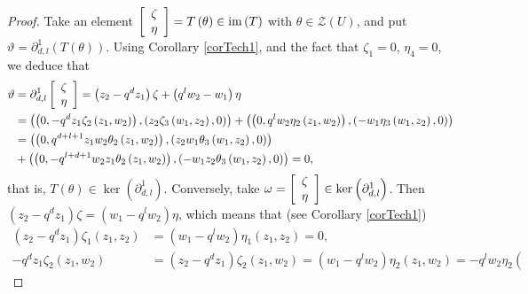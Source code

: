 \documentclass[12pt,reqno]{amsart}%
\theoremstyle{plain}
\numberwithin{theorem}{section} \numberwithin{equation}{section}
\numberwithin{lemma}{section}
\numberwithin{remark}{section}
\numberwithin{example}{section}
\numberwithin{proposition}{section}
\numberwithin{definition}{section}
\numberwithin{corollary}{section}
\begin{document}
\begin{proof}
Take an element $\left[
\begin{array}
[c]{c}%
\zeta\\
\eta
\end{array}
\right]  =T\left(  \theta\right)  \in\operatorname{im}\left(  T\right)  $ with
$\theta\in\mathcal{Z}\left(  U\right)  $, and put $\vartheta=\partial
_{d,l}^{1}\left(  T\left(  \theta\right)  \right)  $. Using Corollary
\ref{corTech1}, and the fact that $\zeta_{1}=0$, $\eta_{4}=0$, we deduce that
\begin{align*}
\vartheta &  =\partial_{d,l}^{1}\left[
\begin{array}
[c]{c}%
\zeta\\
\eta
\end{array}
\right]  =\left(  z_{2}-q^{d}z_{1}\right)  \zeta+\left(  q^{l}w_{2}%
-w_{1}\right)  \eta\\
&  =\left(  \left(  0,-q^{d}z_{1}\zeta_{2}\left(  z_{1},w_{2}\right)  \right)
,\left(  z_{2}\zeta_{3}\left(  w_{1},z_{2}\right)  ,0\right)  \right)
+\left(  \left(  0,q^{l}w_{2}\eta_{2}\left(  z_{1},w_{2}\right)  \right)
,\left(  -w_{1}\eta_{3}\left(  w_{1},z_{2}\right)  ,0\right)  \right) \\
&  =\left(  \left(  0,q^{d+l+1}z_{1}w_{2}\theta_{2}\left(  z_{1},w_{2}\right)
\right)  ,\left(  z_{2}w_{1}\theta_{3}\left(  w_{1},z_{2}\right)  ,0\right)
\right) \\
&  +\left(  \left(  0,-q^{l+d+1}w_{2}z_{1}\theta_{2}\left(  z_{1}%
,w_{2}\right)  \right)  ,\left(  -w_{1}z_{2}\theta_{3}\left(  w_{1}%
,z_{2}\right)  ,0\right)  \right)  =0,
\end{align*}
that is, $T\left(  \theta\right)  \in\ker\left(  \partial_{d,l}^{1}\right)  $.
Conversely, take $\omega=\left[
\begin{array}
[c]{c}%
\zeta\\
\eta
\end{array}
\right]  \in\ker\left(  \partial_{d,l}^{1}\right)  $. Then $\left(
z_{2}-q^{d}z_{1}\right)  \zeta=\left(  w_{1}-q^{l}w_{2}\right)  \eta$, which
means that (see Corollary \ref{corTech1})%
\begin{align*}
\left(  z_{2}-q^{d}z_{1}\right)  \zeta_{1}\left(  z_{1},z_{2}\right)   &
=\left(  w_{1}-q^{l}w_{2}\right)  \eta_{1}\left(  z_{1},z_{2}\right)  =0,\\
-q^{d}z_{1}\zeta_{2}\left(  z_{1},w_{2}\right)   &  =\left(  z_{2}-q^{d}%
z_{1}\right)  \zeta_{2}\left(  z_{1},w_{2}\right)  =\left(  w_{1}-q^{l}%
w_{2}\right)  \eta_{2}\left(  z_{1},w_{2}\right)  =-q^{l}w_{2}\eta_{2}\left(

\end{align*}
\end{proof}
\end{document}
